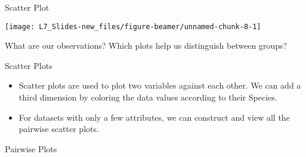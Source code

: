 \documentclass[ignorenonframetext,]{beamer}
\newenvironment{Shaded}{\begin{snugshade}}{\end{snugshade}}
\newcommand{\KeywordTok}[1]{\textcolor{white}{\textbf{{#1}}}}
\newcommand{\NormalTok}[1]{\textcolor{yellow}{{#1}}}
\newcommand{\DataTypeTok}[1]{\textcolor{yellow}{{#1}}}
\newcommand{\DecValTok}[1]{\textcolor{numbercolor}{{#1}}}
\newcommand{\StringTok}[1]{\textcolor{yellow}{{#1}}}
\begin{document}
\begin{frame}[fragile]{Scatter Plot}

\small

\begin{Shaded}
\end{Shaded}

\begin{center}\texttt{[image: L7\_Slides-new\_files/figure-beamer/unnamed-chunk-8-1]} \end{center}

What are our observations? Which plots help us distinguish between
groups?

\end{frame}

\begin{frame}{Scatter Plots}

\begin{itemize}
\item
  Scatter plots are used to plot two variables against each other. We
  can add a third dimension by coloring the data values according to
  their Species.
\item
  For datasets with only a few attributes, we can construct and view all
  the pairwise scatter plots.
\end{itemize}

\end{frame}

\begin{frame}[fragile]{Pairwise Plots}

\small

\begin{Shaded}
\end{Shaded}

\end{frame}
\end{document}
